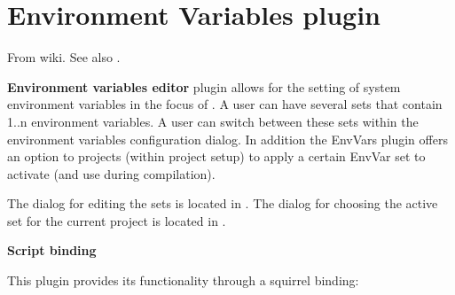 \section{Environment Variables plugin}\label{sec:EnvVar_Plugin}

From \codeblocks wiki. See also .

\textbf{Environment variables editor} plugin allows for the setting of system environment variables in the focus of \codeblocks.\newline
A user can have several sets that contain 1..n environment variables.\newline
A user can switch between these sets within the environment variables configuration dialog.\newline
In addition the EnvVars plugin offers an option to projects (within project setup) to apply a certain EnvVar set to activate (and use during compilation).

The dialog for editing the sets is located in .\newline
The dialog for choosing the active set for the current project is located in . 

\textbf{Script binding}

This plugin provides its functionality through a squirrel binding: 

